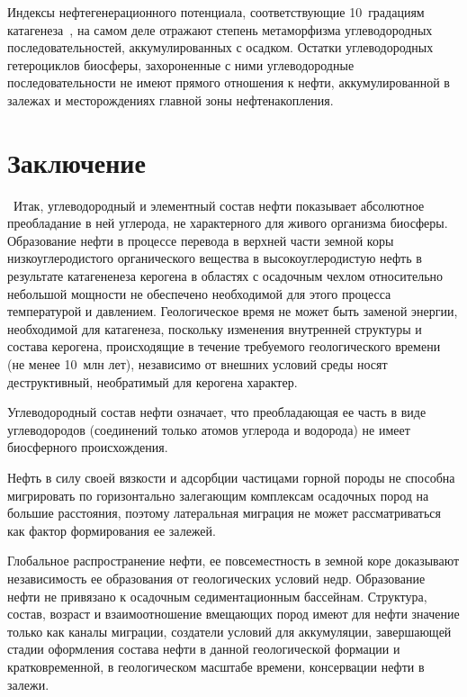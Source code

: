 \begin{multicols}{2}
     Индексы нефтегенерационного потенциала, соответ\-ствующие 10~градациям 
катагенеза~\cite{3s}, на самом деле отражают степень метаморфизма 
углеводо\-родных последовательностей, аккумулированных с осадком. Остатки 
углеводородных гетероциклов биосферы, захороненные с ними углеводородные 
последовательности не имеют прямого отношения к нефти, аккумулированной в 
залежах и месторождениях главной зоны нефтенакопления.
     
     
\section{Заключение}
\
     Итак,      
углеводородный и элементный состав нефти показывает абсолютное 
преобладание в ней углерода, не характерного для живого организма биосферы. 
     Образование нефти в процессе перевода в верхней части земной коры 
низкоуглеродистого органического вещества в высокоуглеродистую нефть в 
результате катагененеза керогена в об\-ластях с осадочным чехлом относительно 
небольшой мощности не обеспечено необходимой для этого процесса 
температурой и давлением. Геологическое время не может быть заменой энергии, 
необходимой для катагенеза, поскольку изменения внутренней структуры и состава 
керогена, происходящие в течение требуемого геологического времени (не менее 
10~млн лет), независимо от внешних условий среды носят деструктивный, 
необратимый для керогена характер. 
     
     Углеводородный состав нефти означает, что преобладающая ее часть в виде 
углеводородов (соединений только атомов углерода и водорода) не имеет 
биосферного происхождения.
     
     Нефть в силу своей вязкости и адсорбции час\-ти\-ца\-ми горной породы не 
способна мигрировать по горизонтально залегающим комплексам осадочных 
пород на большие расстояния, поэтому латеральная миграция не может рассматриваться как фактор 
формирования ее залежей.
     
     Глобальное распространение нефти, ее повсеместность в земной коре 
доказывают независимость ее образования от геологических условий недр. 
Образование нефти не привязано к осадочным седиментационным бассейнам. 
Структура, состав, возраст и взаимоотношение вме\-ща\-ющих пород имеют для 
нефти значение только как каналы миграции, создатели условий для аккумуляции, 
завершающей стадии оформления состава нефти в данной геологической формации 
и кратковременной, в геологическом масштабе времени, консервации нефти в 
залежи.
     

\end{multicols}
